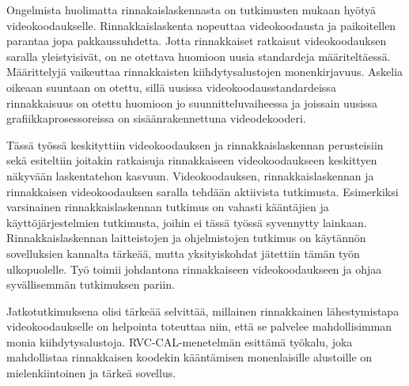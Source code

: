 Ongelmista huolimatta rinnakaislaskennasta on tutkimusten mukaan hyötyä
videokoodaukselle. Rinnakkaislaskenta nopeuttaa videokoodausta ja paikoitellen
parantaa jopa pakkaussuhdetta. Jotta rinnakkaiset ratkaisut videokoodauksen
saralla yleistyisivät, on ne otettava huomioon uusia standardeja
määriteltäessä. Määrittelyjä vaikeuttaa rinnakkaisten kiihdytysalustojen
monenkirjavuus. Askelia oikeaan suuntaan on otettu, sillä uusissa
videokoodausstandardeissa rinnakkaisuus on otettu huomioon jo
suunnitteluvaiheessa ja joissain uusissa grafiikkaprosessoreissa on
sisäänrakennettuna videodekooderi.

Tässä työssä keskityttiin videokoodauksen ja rinnakkaislaskennan perusteisiin
sekä esiteltiin joitakin ratkaisuja rinnakkaiseen videokoodaukseen keskittyen
näkyvään laskentatehon kasvuun. Videokoodauksen, rinnakkaislaskennan ja
rinnakkaisen videokoodauksen saralla tehdään aktiivista tutkimusta. Esimerkiksi
varsinainen rinnakkaislaskennan tutkimus on vahasti kääntäjien ja
käyttöjärjestelmien tutkimusta, joihin ei tässä työssä syvennytty lainkaan.
Rinnakkaislaskennan laitteistojen ja ohjelmistojen tutkimus on käytännön
sovelluksien kannalta tärkeää, mutta yksityiskohdat jätettiin tämän työn ulkopuolelle.
Työ toimii johdantona rinnakkaiseen videokoodaukseen ja ohjaa syvällisemmän
tutkimuksen pariin.

Jatkotutkimuksena olisi tärkeää selvittää, millainen rinnakkainen
lähestymistapa videokoodaukselle on helpointa toteuttaa niin, että se
palvelee mahdollisimman monia kiihdytysalustoja. RVC-CAL-menetelmän esittämä
työkalu, joka mahdollistaa rinnakkaisen koodekin kääntämisen monenlaisille
alustoille on mielenkiintoinen ja tärkeä sovellus. 


